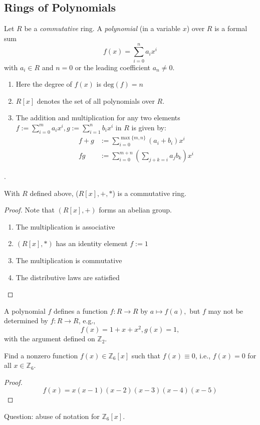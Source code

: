 \subsection{Rings of Polynomials}
\begin{definition}
Let $R$ be a \emph{commutative} ring. A \emph{polynomial} (in a variable $x$) over $R$ is a formal sum
\[
f(x)=\sum_{i=0}^na_ix^i
\]
with $a_i\in R$ and $n=0$ or the leading coefficient $a_n\ne0$. 
\begin{enumerate}
\item
Here the degree of $f(x)$ is $\mbox{deg}(f)=n$
\item
$R[x]$ denotes the set of all polynomials over $R$.
\item
The addition and multiplication for any two elements $f:=\sum_{i=0}^ma_ix^i,g:=\sum_{i=1}^nb_ix^i$ in $R$ is given by:
\begin{align*}
f+g&:=\sum_{i=0}^{\max\{m,n\}}(a_i+b_i)x^i\\
fg&:=\sum_{i=0}^{m+n}(\sum_{j+k=i}a_jb_k)x^i
\end{align*}
\end{enumerate}. 
\end{definition}
\begin{proposition}
With $R$ defined above, ($R[x],+,*$) is a commutative ring.
\end{proposition}
\begin{proof}
Note that $(R[x],+)$ forms an abelian group. 
\begin{enumerate}
\item
The multiplication is associative
\item
$(R[x],*)$ has an identity element $f:=1$
\item
The multiplication is commutative
\item
The distributive laws are satisfied
\end{enumerate}

\end{proof}

\begin{remark}
A polynomial $f$ defines a function $f:R\to R$ by $a\mapsto f(a),$ but $f$ may not be determined by $f:R\to R$, e.g.,
\[
f(x)=1+x+x^2,g(x)=1,
\]
with the argument defined on $\mathbb{Z}_2$.
\end{remark}
\begin{proposition}
Find a nonzero function $f(x)\in\mathbb{Z}_6[x]$ such that $f(x)\equiv0$, i.e., $f(x)=0$ for all $x\in\mathbb{Z}_6$.
\end{proposition}
\begin{proof}
\[
f(x) = x(x-1)(x-2)(x-3)(x-4)(x-5)
\]
\end{proof}
Question: abuse of notation for $\mathbb{Z}_6[x]$.

